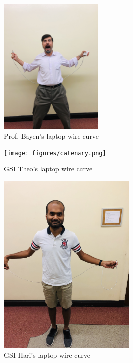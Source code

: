 \begin{enumerate}
 \begin{figure}[H]
     \centering
     \includegraphics[width=0.45\textwidth]{figures/ab.jpg}
     \caption{Prof. Bayen's laptop wire curve}
 \end{figure}
 \begin{figure}[H]
  \centering
  \begin{minipage}[b]{0.45\textwidth}
    \texttt{[image: figures/catenary.png]}
    \caption{GSI Theo's laptop wire curve}
  \end{minipage}
  \hfill
  \begin{minipage}[b]{0.45\textwidth}
    \includegraphics[height=9cm]{figures/hpd.jpg}
    \caption{GSI Hari's laptop wire curve}
  \end{minipage}
\end{figure}
\begin{figure}[H]
  \centering
  \begin{minipage}[b]{0.45\textwidth}

\end{minipage}
\end{figure}
\end{enumerate}
